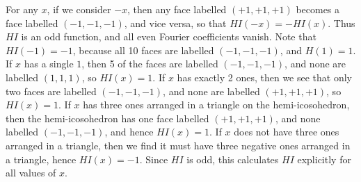 \begin{example}
    For any $x$, if we consider $-x$, then any face labelled $(+1,+1,+1)$ becomes a face labelled $(-1,-1,-1)$, and vice versa, so that $HI(-x) = - HI(x)$. Thus $HI$ is an odd function, and all even Fourier coefficients vanish. Note that $HI(-1) = -1$, because all 10 faces are labelled $(-1,-1,-1)$, and $H(1) = 1$. If $x$ has a single $1$, then 5 of the faces are labelled $(-1,-1,-1)$, and none are labelled $(1,1,1)$, so $HI(x) = 1$. If $x$ has exactly 2 ones, then we see that only two faces are labelled $(-1,-1,-1)$, and none are labelled $(+1,+1,+1)$, so $HI(x) = 1$. If $x$ has three ones arranged in a triangle on the hemi-icosohedron, then the hemi-icosohedron has one face labelled $(+1,+1,+1)$, and none labelled $(-1,-1,-1)$, and hence $HI(x) = 1$. If $x$ does not have three ones arranged in a triangle, then we find it must have three negative ones arranged in a triangle, hence $HI(x) = -1$. Since $HI$ is odd, this calculates $HI$ explicitly for all values of $x$.


\end{example}
